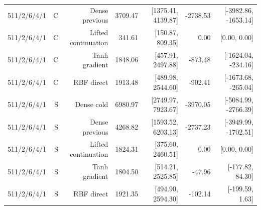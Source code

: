 \documentclass[11pt,letterpaper]{article}
\theoremstyle{definition}
\newcommand{\1}{\mathbf 1}
\begin{document}
\begin{table}[tbp]
\begin{tabular}{lrrrrrr}
511/2/6/4/1 & C & Dense previous & 3709.47 & [1375.41, 4139.87] & -2738.53 & [-3982.86, -1653.14]\\
511/2/6/4/1 & C & Lifted continuation & 341.61 & [150.87, 809.35] & 0.00 & [0.00, 0.00]\\
511/2/6/4/1 & C & Tanh gradient & 1848.06 & [457.91, 2497.88] & -873.48 & [-1624.04, -234.16]\\
511/2/6/4/1 & C & RBF direct & 1913.48 & [489.98, 2544.60] & -902.41 & [-1673.68, -265.04]\\
511/2/6/4/1 & S & Dense cold & 6980.97 & [2749.97, 7923.67] & -3970.05 & [-5084.99, -2766.39]\\
511/2/6/4/1 & S & Dense previous & 4268.82 & [1593.52, 6203.13] & -2737.23 & [-3949.99, -1702.51]\\
511/2/6/4/1 & S & Lifted continuation & 1824.31 & [375.60, 2460.51] & 0.00 & [0.00, 0.00]\\
511/2/6/4/1 & S & Tanh gradient & 1804.50 & [514.21, 2525.85] & -47.96 & [-177.82, 84.30]\\
511/2/6/4/1 & S & RBF direct & 1921.35 & [494.90, 2594.30] & -102.14 & [-199.59, 1.63]\\
\bottomrule
\end{tabular}
\end{table}
\end{document}

